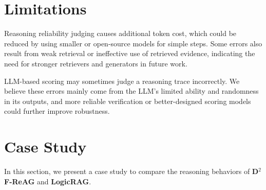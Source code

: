 \documentclass[11pt]{article}
\begin{document}
\section{Limitations}
Reasoning reliability judging causes additional token cost, which could be reduced by using smaller or open-source models for simple steps. Some errors also result from weak retrieval or ineffective use of retrieved evidence, indicating the need for stronger retrievers and generators in future work.

LLM-based scoring may sometimes judge a reasoning trace incorrectly. We believe these errors mainly come from the LLM’s limited ability and randomness in its outputs, and more reliable verification or better-designed scoring models could further improve robustness.

%


\appendix

\onecolumn
\section{Case Study}
\label{sec:appendix}
In this section, we present a case study to compare the reasoning behaviors of \textbf{D$^2$F-ReAG} and \textbf{LogicRAG}.
\end{document}
